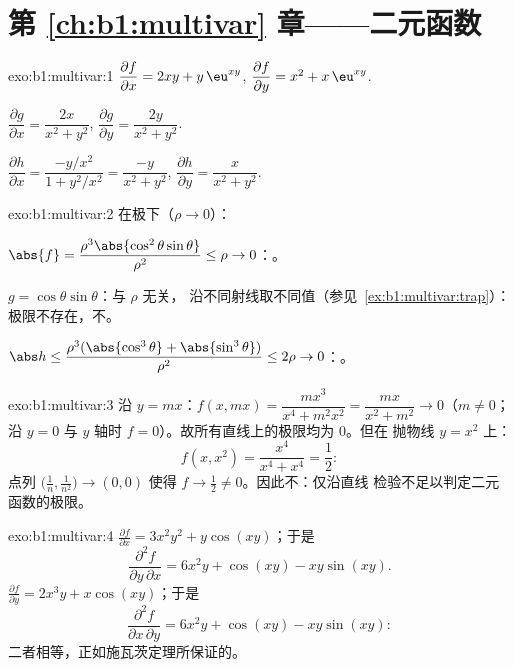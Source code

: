 \section*{第 \ref{ch:b1:multivar} 章——二元函数}

\begin{solution}{exo:b1:multivar:1}
$\dfrac{\partial f}{\partial x} = 2xy + y\,\eu^{xy}$,
$\dfrac{\partial f}{\partial y} = x^2 + x\,\eu^{xy}$.

$\dfrac{\partial g}{\partial x} = \dfrac{2x}{x^2+y^2}$,
$\dfrac{\partial g}{\partial y} = \dfrac{2y}{x^2+y^2}$.

$\dfrac{\partial h}{\partial x} = \dfrac{-y/x^2}{1 + y^2/x^2} =
\dfrac{-y}{x^2+y^2}$,
$\dfrac{\partial h}{\partial y} = \dfrac{x}{x^2+y^2}$.
\end{solution}

\begin{solution}{exo:b1:multivar:2}
在极下（$\rho \to 0$）：

$\abs{f} = \dfrac{\rho^3\abs{\cos^2\theta\sin\theta}}{\rho^2} \leq
\rho \to 0$：。

$g = \cos\theta\sin\theta$：与 $\rho$ 无关，
沿不同射线取不同值（参见\
\cref{ex:b1:multivar:trap}）：极限不存在，不。

$\abs h \leq \dfrac{\rho^3(\abs{\cos^3\theta} +
\abs{\sin^3\theta})}{\rho^2} \leq 2\rho \to 0$：。
\end{solution}

\begin{solution}{exo:b1:multivar:3}
沿 $y = mx$：$f(x, mx) = \dfrac{m x^3}{x^4 + m^2 x^2} =
\dfrac{mx}{x^2 + m^2} \to 0$（$m \neq 0$；沿 $y = 0$ 与
$y$ 轴时 $f = 0$）。故所有直线上的极限均为 $0$。但在
抛物线 $y = x^2$ 上：
\[
f(x, x^2) = \frac{x^4}{x^4 + x^4} = \frac12 :
\]
点列 $\bigl(\frac1n, \frac{1}{n^2}\bigr) \to (0,0)$ 使得
$f \to \frac12 \neq 0$。因此不：仅沿直线
检验不足以判定二元函数的极限。
\end{solution}

\begin{solution}{exo:b1:multivar:4}
$\frac{\partial f}{\partial x} = 3x^2y^2 + y\cos(xy)$；于是
\[
\frac{\partial^2 f}{\partial y\,\partial x}
= 6x^2 y + \cos(xy) - xy\sin(xy) .
\]
$\frac{\partial f}{\partial y} = 2x^3 y + x\cos(xy)$；于是
\[
\frac{\partial^2 f}{\partial x\,\partial y}
= 6x^2 y + \cos(xy) - xy\sin(xy) :
\]
二者相等，正如施瓦茨定理所保证的。
\end{solution}

